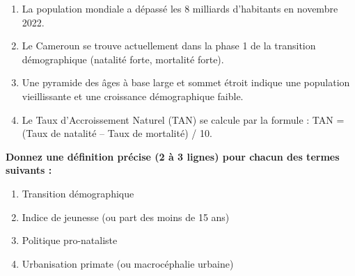 \documentclass[11pt]{article}
\begin{document}
\begin{exercice}
\begin{enumerate}
    \item La population mondiale a dépassé les 8 milliards d'habitants en novembre 2022.
    \item Le Cameroun se trouve actuellement dans la phase 1 de la transition démographique (natalité forte, mortalité forte).
    \item Une pyramide des âges à base large et sommet étroit indique une population vieillissante et une croissance démographique faible.
    \item Le Taux d'Accroissement Naturel (TAN) se calcule par la formule : TAN = (Taux de natalité -- Taux de mortalité) / 10.
\end{enumerate}
\end{exercice}

\begin{exercice}
\textbf{Donnez une définition précise (2 à 3 lignes) pour chacun des termes suivants :}
\begin{enumerate}
    \item Transition démographique
    \item Indice de jeunesse (ou part des moins de 15 ans)
    \item Politique pro-nataliste
    \item Urbanisation primate (ou macrocéphalie urbaine)
\end{enumerate}
\end{exercice}
\end{document}
